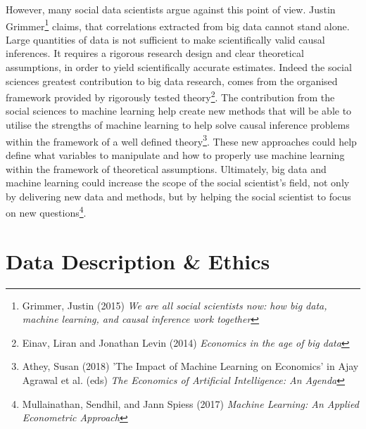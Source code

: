 \documentclass[12pt,a4paper]{article}
\begin{document}
However, many social data scientists argue against this point of view. Justin Grimmer\footnote{Grimmer, Justin (2015) \textit{We are all social scientists now: how big data, machine learning, and causal inference work together}} claims, that correlations extracted from big data cannot stand alone. Large quantities of data is not sufficient to make scientifically valid causal inferences. It requires a rigorous research design and clear theoretical assumptions, in order to yield scientifically accurate estimates. Indeed the social sciences greatest contribution to big data research, comes from the organised framework provided by rigorously tested theory\footnote{Einav, Liran and Jonathan Levin (2014) \textit{Economics in the age of big data}}.\newline
The contribution from the social sciences to machine learning help create new methods that will be able to utilise the strengths of machine learning to help solve causal inference problems within the framework of a well defined theory\footnote{Athey, Susan (2018) 'The Impact of Machine Learning on Economics' in Ajay Agrawal et al. (eds) \textit{The Economics of Artificial Intelligence: An Agenda}}. These new approaches could help define what variables to manipulate and how to properly use machine learning within the framework of theoretical assumptions. Ultimately, big data and machine learning could increase the scope of the social scientist's field, not only by delivering new data and methods, but by helping the social scientist to focus on new questions\footnote{Mullainathan, Sendhil, and Jann Spiess (2017) \textit{Machine Learning: An Applied Econometric Approach}}.

\section{Data Description \& Ethics}
\end{document}
